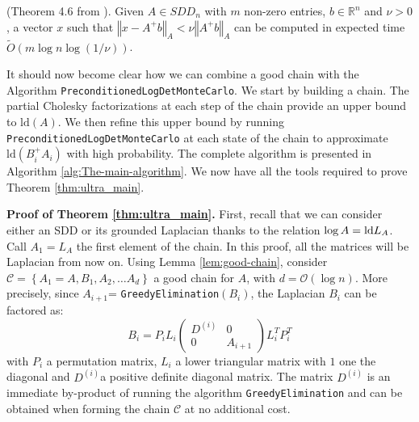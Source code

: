 \begin{lemma}
\label{lem:linear-precond-existence}(Theorem 4.6 from \cite{Koutis2011}).
Given $A\in SDD_{n}$ with $m$ non-zero entries, $b\in\mathbb{R}^{n}$
and $\nu>0$, a vector $x$ such that $\left\Vert x-A^{+}b\right\Vert _{A}<\nu\left\Vert A^{+}b\right\Vert _{A}$
can be computed in expected time $\tilde{O}\left(m\log n\log\left(1/\nu\right)\right)$.
\end{lemma}
It should now become clear how we can combine a good chain with the
Algorithm \texttt{PreconditionedLogDetMonteCarlo}. We start by building
a chain. The partial Cholesky factorizations at each step of the chain
provide an upper bound to $\mbox{ld}\left(A\right)$. We then refine
this upper bound by running \texttt{PreconditionedLogDetMonteCarlo}
at each state of the chain to approximate $\mbox{ld}\left(B_{i}^{+}A_{i}\right)$
with high probability. The complete algorithm is presented in Algorithm
\ref{alg:The-main-algorithm}. We now have all the tools required
to prove Theorem \ref{thm:ultra_main}.

\textbf{Proof of Theorem \ref{thm:ultra_main}.} First, recall that
we can consider either an SDD or its grounded Laplacian thanks to
the relation $\log A=\text{\textnormal{ld}} L_{A}$. Call $A_{1}=L_{A}$ the first element
of the chain. In this proof, all the matrices will be Laplacian from
now on. Using Lemma \ref{lem:good-chain}, consider $\mathcal{C}=\left\{ A_{1}=A,B_{1},A_{2},\dots A_{d}\right\} $
a good chain for $A$, with $d=\mathcal{O}\left(\log n\right)$. More
precisely, since $A_{i+1}$= \texttt{GreedyElimination}$\left(B_{i}\right)$,
the Laplacian $B_{i}$ can be factored as: 
\[
B_{i}=P_{i}L_{i}\left(\begin{array}{cc}
D^{\left(i\right)} & 0\\
0 & A_{i+1}
\end{array}\right)L_{i}^{T}P_{i}^{T}
\]
with $P_{i}$ a permutation matrix, $L_{i}$ a lower triangular matrix
with $1$ one the diagonal and $D^{\left(i\right)}$a positive definite
diagonal matrix. The matrix $D^{\left(i\right)}$ is an immediate
by-product of running the algorithm \texttt{GreedyElimination} and
can be obtained when forming the chain $\mathcal{C}$ at no additional
cost.

